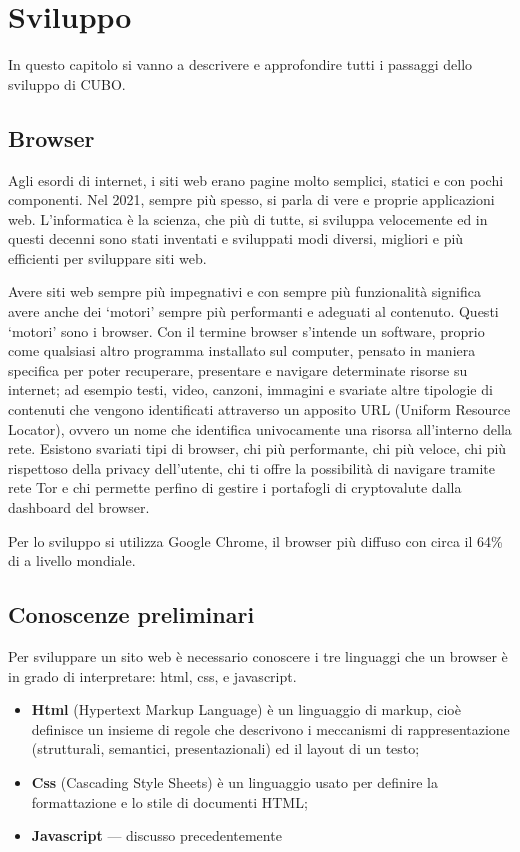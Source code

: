 \documentclass[12pt,a4paper]{article}
\begin{document}
\section{Sviluppo}
In questo capitolo si vanno a descrivere e approfondire tutti i passaggi dello sviluppo di CUBO.

\subsection{Browser}

Agli esordi di internet, i siti web erano pagine molto semplici, statici e con pochi componenti. Nel 2021, sempre più spesso, si parla di vere e proprie applicazioni web. L’informatica è la scienza, che più di tutte, si sviluppa velocemente ed in questi decenni sono stati inventati e sviluppati modi diversi, migliori e più efficienti per sviluppare siti web.

Avere siti web sempre più impegnativi e con sempre più funzionalità significa avere anche dei ‘motori’ sempre più performanti e adeguati al contenuto. Questi ‘motori’ sono i browser. Con il termine browser s’intende un software, proprio come qualsiasi altro programma installato sul computer, pensato in maniera specifica per poter recuperare, presentare e navigare determinate risorse su internet; ad esempio testi, video, canzoni, immagini e svariate altre tipologie di contenuti che vengono identificati attraverso un apposito URL (Uniform Resource Locator), ovvero un nome che identifica univocamente una risorsa all’interno della rete.
Esistono svariati tipi di browser, chi più performante, chi più veloce, chi più rispettoso della privacy dell’utente, chi ti offre la possibilità di navigare tramite rete Tor e chi permette perfino di gestire i portafogli di cryptovalute dalla dashboard del browser.

Per lo sviluppo si utilizza Google Chrome, il browser più diffuso con circa il 64\% di a livello mondiale.

\subsection{Conoscenze preliminari}
Per sviluppare un sito web è necessario conoscere i tre linguaggi che un browser è in grado di interpretare: html, css, e javascript.
\begin{itemize}
    \item \textbf{Html} (Hypertext Markup Language) è un linguaggio di markup, cioè definisce un insieme di regole che descrivono i meccanismi di rappresentazione (strutturali, semantici, presentazionali) ed il layout di un testo;
    \item \textbf{Css} (Cascading Style Sheets) è un linguaggio usato per definire la formattazione e lo stile di documenti HTML;
    \item \textbf{Javascript} --- discusso precedentemente
\end{itemize}
\end{document}
